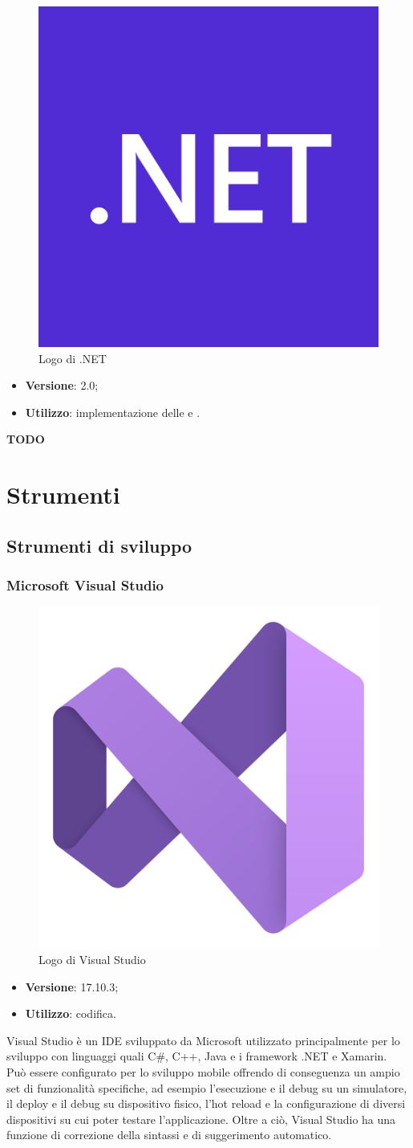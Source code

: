 \begin{figure}[H]
    \centering 
    \includegraphics[width=0.2\columnwidth]{images/loghi/Microsoft_.NET_logo.png} 
    \caption{Logo di .NET}
\end{figure}

\begin{itemize}
    \item \textbf{Versione}: 2.0;
    \item \textbf{Utilizzo}: implementazione delle  e .
\end{itemize}

\textbf{TODO}

\section{Strumenti}

\subsection{Strumenti di sviluppo}

\subsubsection{Microsoft Visual Studio}

\begin{figure}[H]
    \centering 
    \includegraphics[width=0.3\columnwidth]{images/loghi/Visual_Studio.png} 
    \caption{Logo di Visual Studio}
\end{figure}

\begin{itemize}
    \item \textbf{Versione}: 17.10.3;
    \item \textbf{Utilizzo}: codifica.
\end{itemize}
Visual Studio è un IDE sviluppato da Microsoft utilizzato principalmente per lo sviluppo con linguaggi quali C\#, C++, Java e i framework .NET e Xamarin.\\
Può essere configurato per lo sviluppo mobile offrendo di conseguenza un ampio set di funzionalità specifiche, ad esempio l'esecuzione e il debug su un simulatore, il deploy e il debug su dispositivo fisico, l'hot reload e la configurazione di diversi dispositivi su cui poter testare l'applicazione. Oltre a ciò, Visual Studio ha una funzione di correzione della sintassi e di suggerimento automatico.

